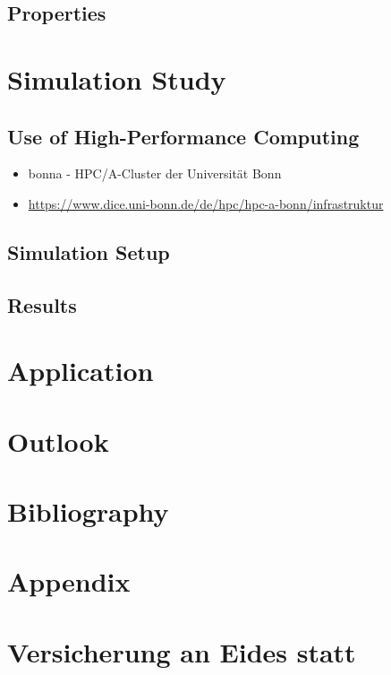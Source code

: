 \documentclass[11pt,twoside,a4paper]{article}
\theoremstyle{MAstyle} \newtheorem{assumption}{Assumption}
\theoremstyle{MAstyle} \newtheorem{definition}{Definition}
\begin{document}
		\subsection{Properties}
		
	\section{Simulation Study}\label{Simulation_Study}
	
		\subsection{Use of High-Performance Computing}
			\begin{itemize}
				\item bonna - HPC/A-Cluster der Universität Bonn
				\item \url{https://www.dice.uni-bonn.de/de/hpc/hpc-a-bonn/infrastruktur}
			\end{itemize}
	
		\subsection{Simulation Setup}
		
		\subsection{Results}
		
	\section{Application}\label{Application}
	
	\section{Outlook}\label{Outlook}
	
	\newpage
	\section{Bibliography}
	\printbibliography[heading=none]
	
	\newpage
	\section{Appendix}
	
	\newpage
	
	\section{Versicherung an Eides statt}	
	
\end{document}
